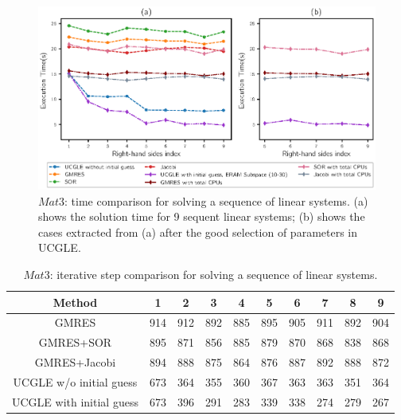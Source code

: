 \begin{figure}[t]
	\centering
	\includegraphics[width=0.99\linewidth]{fig/seqrhs2.eps}
	\caption{$Mat3$: time comparison for solving a sequence of linear systems. (a) shows the solution time for 9 sequent linear systems; (b) shows the cases extracted from (a) after the good selection of parameters in UCGLE.}
	\label{fig:seqrhs2}
\end{figure}

\begin{table}[htbp]
	\small
	\label{tb2}
	\caption{$Mat3$: iterative step comparison for solving a sequence of linear systems.}
	\centering
	\renewcommand{\arraystretch}{1.6}
	\begin{tabular}{c*{9}{c}}
		\toprule
		\cellcolor{gray!50}Method              & \cellcolor{gray!50}1 &  \cellcolor{gray!50}2 &  \cellcolor{gray!50}3 &  \cellcolor{gray!50}4 &  \cellcolor{gray!50}5  &  \cellcolor{gray!50}6  & \cellcolor{gray!50}7 & \cellcolor{gray!50}8 & \cellcolor{gray!50}9\\
		\midrule
		GMRES & 914 & 912 & 892 &885  & 895 & 905  &911&892& 904\\
		\cellcolor{gray!20}GMRES+SOR            & 	\cellcolor{gray!20}895 & 	\cellcolor{gray!20}871 & 	\cellcolor{gray!20}856 & 	\cellcolor{gray!20}885 & 	\cellcolor{gray!20}879 & 	\cellcolor{gray!20}870 &	\cellcolor{gray!20}868&	\cellcolor{gray!20}838&	\cellcolor{gray!20}868\\
		GMRES+Jacobi            & 894 & 888 & 875 & 864 & 876 & 887 &892&888&872\\
			\cellcolor{gray!20}UCGLE w/o initial guess     & 	\cellcolor{gray!20}673 & 	\cellcolor{gray!20}364 & 	\cellcolor{gray!20}355 & 	\cellcolor{gray!20}360 & 	\cellcolor{gray!20}367 &	\cellcolor{gray!20}363 &	\cellcolor{gray!20}363&	\cellcolor{gray!20}351& 	\cellcolor{gray!20}364\\
		UCGLE with initial guess     & 673 & 396 & 291 & 283 & 339 & 338  & 274 & 279 & 267\\
		\hline
	\end{tabular}
\end{table}

